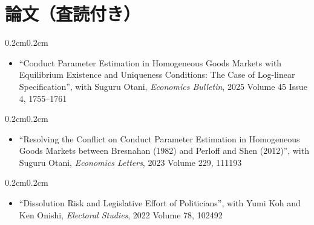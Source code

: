 \documentclass[10pt, letterpaper]{article}
\newenvironment{highlights}{
    \begin{itemize}[
        topsep=0.10cm,
        parsep=0.10cm,
        partopsep=0pt,
        itemsep=0.0cm,
        leftmargin=0.4cm + 10pt
    ]
}{
    \end{itemize}
}
\newenvironment{onecolentry}{
    \begin{adjustwidth}{0.2cm}{0.2cm}
}{
    \end{adjustwidth}
}
\begin{document}
    \section{論文（査読付き）}
    \begin{samepage}
        \begin{onecolentry}
            \begin{highlights}
                \item ``Conduct Parameter Estimation in Homogeneous Goods Markets with Equilibrium Existence and Uniqueness Conditions: The Case of Log-linear Specification'', with Suguru Otani, \textit{Economics Bulletin}, 2025 Volume 45 Issue 4, 1755--1761
            \end{highlights}
        \end{onecolentry}
    \end{samepage}
    \vspace{0.10cm}
    \begin{samepage}
        \begin{onecolentry}
            \begin{highlights}
                \item ``Resolving the Conflict on Conduct Parameter Estimation in Homogeneous Goods Markets between Bresnahan (1982) and Perloff and Shen (2012)'', with Suguru Otani, \textit{Economics Letters}, 2023 Volume 229, 111193
            \end{highlights}
        \end{onecolentry}
    \end{samepage}
    \vspace{0.10cm}
    \begin{samepage}
        \begin{onecolentry}
            \begin{highlights}
                \item ``Dissolution Risk and Legislative Effort of Politicians'', with Yumi Koh and Ken Onishi, \textit{Electoral Studies}, 2022 Volume 78, 102492
            \end{highlights}
        \end{onecolentry}
    \end{samepage}
\end{document}
